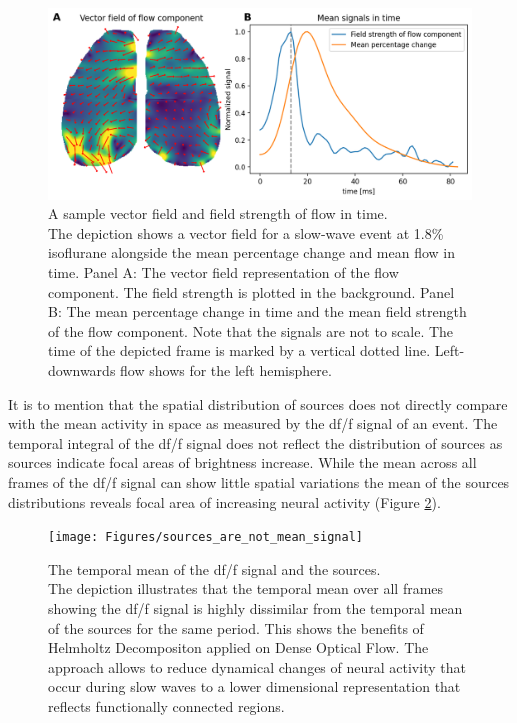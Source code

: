 \begin{figure}[!htb]
\centering
\includegraphics[width=\textwidth,height=\textheight,keepaspectratio]{Figures/vector_field_flow_component}
\decoRule
\caption[A sample vector field and field strength of flow in time.]{A sample vector field and field strength of flow in time.\\ The depiction shows a vector field for a slow-wave event at 1.8\% isoflurane alongside the mean percentage change and mean flow in time. Panel A: The vector field representation of the flow component. The field strength is plotted in the background. Panel B: The mean percentage change in time and the mean field strength of the flow component. Note that the signals are not to scale. The time of the depicted frame is marked by a vertical dotted line. Left-downwards flow shows for the left hemisphere.}
\label{fig:vector_field_flow_component}
\end{figure}
It is to mention that the spatial distribution of sources does not directly compare with the mean activity in space as measured by the df/f signal of an event. The temporal integral of the df/f signal does not reflect the distribution of sources as sources indicate focal areas of brightness increase. While the mean across all frames of the df/f signal can show little spatial variations the mean of the sources distributions reveals focal area of increasing neural activity (Figure \ref{fig:sources_are_not_mean_signal}).\\
\begin{figure}[!htb]
\centering
\texttt{[image: Figures/sources\_are\_not\_mean\_signal]}
\decoRule
\caption[The temporal mean of the df/f signal and the sources]{The temporal mean of the df/f signal and the sources.\\ The depiction illustrates that the temporal mean over all frames showing the df/f signal is highly dissimilar from the temporal mean of the sources for the same period. This shows the benefits of Helmholtz Decompositon applied on Dense Optical Flow. The approach allows to reduce dynamical changes of neural activity that occur during slow waves to a lower dimensional representation that reflects functionally connected regions.}
\label{fig:sources_are_not_mean_signal}
\end{figure}

